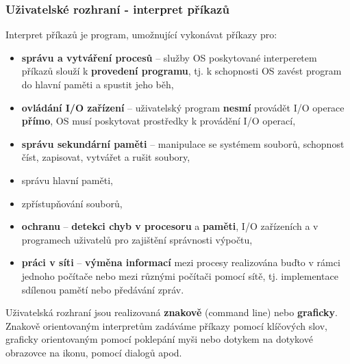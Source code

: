 \subsubsection{Uživatelské rozhraní - interpret příkazů}
Interpret příkazů je program, umožnující vykonávat příkazy pro:
\begin{itemize}
	\item \textbf{správu a vytváření procesů} -- služby OS poskytované interperetem příkazů slouží k \textbf{provedení programu}, tj. k schopnosti OS zavést program do hlavní paměti a spustit jeho běh,
	\item \textbf{ovládání I/O zařízení} -- uživatelský program \textbf{nesmí} provádět I/O operace \textbf{přímo}, OS musí poskytovat prostředky k provádění I/O operací,
	\item \textbf{správu sekundární paměti} -- manipulace se systémem souborů, schopnost číst, zapisovat, vytvářet a rušit soubory,
	\item správu hlavní paměti,
	\item zpřístupňování souborů,
	\item \textbf{ochranu} -- \textbf{detekci chyb v procesoru} a \textbf{paměti}, I/O zařízeních a v programech uživatelů pro zajištění správnosti výpočtu,
	\item \textbf{práci v síti} -- \textbf{výměna informací} mezi procesy realizována buďto v rámci jednoho počítače nebo mezi různými počítači pomocí sítě, tj. implementace sdílenou pamětí nebo předávání zpráv.
\end{itemize}
Uživatelská rozhraní jsou realizovaná \textbf{znakově} (command line) nebo \textbf{graficky}. Znakově orientovaným interpretům zadáváme příkazy pomocí klíčových slov, graficky orientovaným pomocí poklepání myši nebo dotykem na dotykové obrazovce na ikonu, pomocí dialogů apod.

